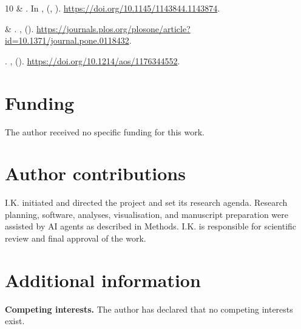 \documentclass[11pt,letterpaper]{article}
\begin{document}
\begin{thebibliography}{10}
 \& 
\newblock {}.
\newblock In \emph{}, 
  (,
  ).
\newblock \urlprefix\url{https://doi.org/10.1145/1143844.1143874}.

 \& 
\newblock {}.
\newblock \emph{} \textbf{},
   ().
\newblock
  \urlprefix\url{https://journals.plos.org/plosone/article?id=10.1371/journal.pone.0118432}.

\newblock {}.
\newblock \emph{}
  \textbf{},  ().
\newblock \urlprefix\url{https://doi.org/10.1214/aos/1176344552}.

\end{thebibliography}



\section*{Funding}
The author received no specific funding for this work.
\section*{Author contributions}
I.K. initiated and directed the project and set its research agenda.
Research planning, software, analyses, visualisation, and manuscript preparation
were assisted by AI agents as described in Methods. I.K. is responsible for
scientific review and final approval of the work.
\section*{Additional information}
\textbf{Competing interests.} The author has declared that no competing interests exist.
\end{document}
